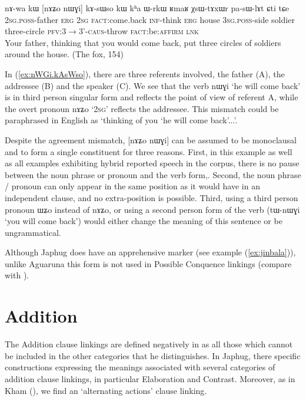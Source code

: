 \documentclass[oldfontcommands,oneside,a4paper,11pt]{article}
\newcommand{\ipa}[1]{{\phon \mbox{#1}}} %
\newcommand{\refb}[1]{(\ref{#1})}
\begin{document}
  \begin{exe}
\ex \label{ex:nWGi.kAsWso}
\gll 
\ipa{nɤ-wa}  	\ipa{kɯ}  	[\ipa{nɤʑo}  	\ipa{nɯɣi}]  	\ipa{kɤ-sɯso}  	\ipa{kɯ}  	\ipa{kʰa}  	\ipa{ɯ-rkɯ}  	\ipa{ʁmaʁ}  	\ipa{χsɯ-tɤxɯr}  	\ipa{pa-sɯ-lɤt}  	\ipa{ɕti}  	\ipa{tɕe}  \\
\textsc{2sg.poss}-father \textsc{erg} \textsc{2sg} \textsc{fact}:come.back  \textsc{inf}-think \textsc{erg} house \textsc{3sg.poss}-side soldier three-circle \textsc{pfv:3$\rightarrow$3'-caus}-throw \textsc{fact}:be:\textsc{affirm} \textsc{lnk}\\
\glt Your father, thinking that you would come back,   put three circles of soldiers around the house. (The fox, 154)

 \end{exe}
 
In \refb{ex:nWGi.kAsWso}, there are three referents involved, the father (A), the addressee (B) and the speaker (C). We see that the verb  	\ipa{nɯɣi} `he will come back' is in third person singular form and reflects the point of view of referent A, while the overt pronoun \ipa{nɤʑo} `\textsc{2sg}' reflects the addressee. This mismatch could be paraphrased in English as `thinking of you `he will come back'...'.  

Despite the agreement mismatch, 	[\ipa{nɤʑo}  	\ipa{nɯɣi}] can be assumed to be monoclausal and to form a single constituent for three reasons. First, in this example as well as all examples exhibiting   hybrid reported speech in the corpus, there is no   pause between the noun phrase or pronoun and the verb form,. Second,  the noun phrase / pronoun can only appear in the same position as it would have in an independent clause, and no extra-position is possible. Third, using a third person pronoun \ipa{ɯʑo} instead of \ipa{nɤʑo}, or using a second person form of the verb (\ipa{tɯ-nɯɣi} `you will come back') would either change the meaning of this sentence or be ungrammatical.
 
Although Japhug does have an apprehensive marker (see example \refb{ex:jinbala}), unlike Aguaruna this form is not used in Possible Conquence linkings  (compare with \citealt[187]{overall09linking}). 


\section{Addition}
The Addition clause linkings are defined negatively in \citet[26]{dixon09intro} as all those which cannot be included in the other categories that he distinguishes. In Japhug,    there   specific constructions   expressing the meanings associated with several categories of addition clause linkings, in particular Elaboration and Contrast. Moreover, as in Kham (\citealt[113]{watters09kham}), we find an `alternating actions' clause linking.
\end{document}
